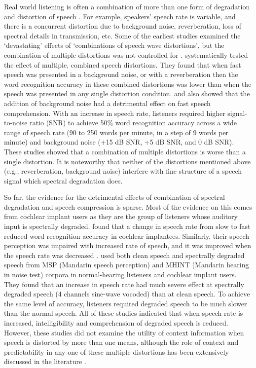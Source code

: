 \documentclass[a4paper, nobind]{templates/ociamthesis}
\begin{document}
Real world listening is often a combination of more than one form of degradation and distortion of speech \autocites{Gordonsalant1995}[see also,][]{Cooke2014}.
For example, speakers' speech rate is variable, and there is a concurrent distortion due to background noise, reverberation, loss of spectral details in transmission, etc.
Some of the earliest studies examined the `devastating' effects of `combinations of speech wave distortions', but the combination of multiple distortions was not controlled for \autocite{Martin1956,Harris1960}.
\textcite{Gordonsalant1995} systematically tested the effect of multiple, combined speech distortions.
They found that when fast speech was presented in a background noise, or with a reverberation then the word recognition accuracy in these combined distortions was lower than when the speech was presented in any single distortion condition.
\textcite{Adams2009} and \textcite{Adams2012} also showed that the addition of background noise had a detrimental effect on fast speech comprehension.
With an increase in speech rate, listeners required higher signal-to-noise ratio (SNR) to achieve 50\% word recognition accuracy across a wide range of speech rate (90 to 250 words per minute, in a step of 9 words per minute) and background noise (+15 dB SNR, +5 dB SNR, and 0 dB SNR).
These studies showed that a combination of multiple distortions is worse than a single distortion.
It is noteworthy that neither of the distortions mentioned above (e.g., reverberation, background noise) interfere with fine structure of a speech signal which spectral degradation does.

So far, the evidence for the detrimental effects of combination of spectral degradation and speech compression is sparse. Most of the evidence on this comes from cochlear implant users \autocites[e.g.,][]{Li2011,Su2016} as they are the group of listeners whose auditory input is spectrally degraded.
\textcite{Iwasaki2002} found that a change in speech rate from slow to fast reduced word recognition accuracy in cochlear implantees.
Similarly, their speech perception was impaired with increased rate of speech, and it was improved when the speech rate was decreased \autocite[e.g.,][]{Dincer2018}.
\textcite{Meng2019} used both clean speech and spectrally degraded speech from MSP (Mandarin speech perception) and MHINT (Mandarin hearing in noise test) corpora in normal-hearing listeners and cochlear implant users.
They found that an increase in speech rate had much severe effect at spectrally degraded speech (4 channels sine-wave vocoded) than at clean speech.
To achieve the same level of accuracy, listeners required degraded speech to be much slower than the normal speech.
All of these studies indicated that when speech rate is increased, intelligibility and comprehension of degraded speech is reduced.
However, these studies did not examine the utility of context information when speech is distorted by more than one means, although the role of context and predictability in any one of these multiple distortions has been extensively discussed in the literature
\autocite{Aydelott2004,Sheldon2008a,Sheldon2008b,Obleser2010,Goy2013,Corps2020,Bhandari2021,Clark2021,vanOs2021}.
\end{document}
